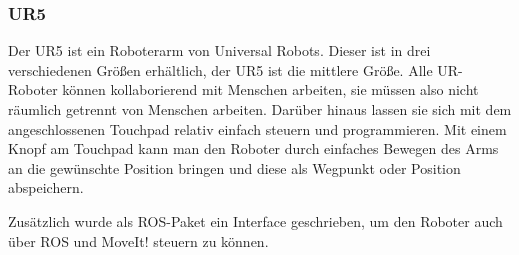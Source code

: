 \subsubsection{UR5} %
\label{ssub:ur5}
Der UR5 ist ein Roboterarm von Universal Robots. Dieser ist in drei verschiedenen Größen erhältlich, der UR5 ist die mittlere Größe. Alle UR-Roboter können kollaborierend mit Menschen arbeiten, sie müssen also nicht räumlich getrennt von Menschen arbeiten. Darüber hinaus lassen sie sich mit dem angeschlossenen Touchpad relativ einfach steuern und programmieren. Mit einem Knopf am Touchpad kann man den Roboter durch einfaches Bewegen des Arms an die gewünschte Position bringen und diese als Wegpunkt oder Position abspeichern. 

Zusätzlich wurde als ROS-Paket ein Interface geschrieben, um den Roboter auch über ROS und MoveIt! steuern zu können.
